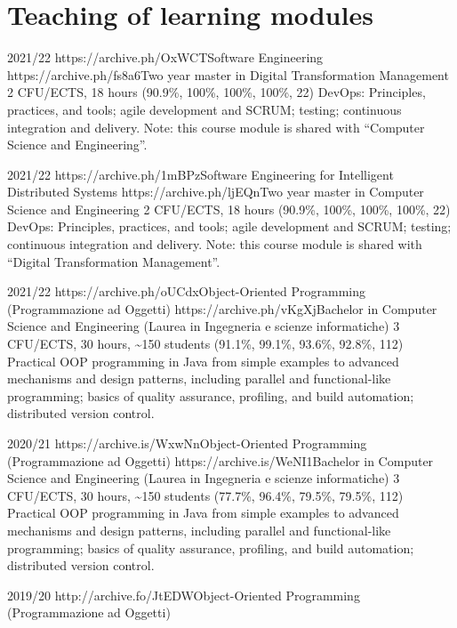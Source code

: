 \section{Teaching of learning modules}
\vspace{-1.9em}
\newcommand{\oopjava}{Practical OOP programming in Java from simple examples to advanced mechanisms and design patterns, including parallel and functional-like programming; basics of quality assurance, profiling, and build automation; distributed version control.}
\newcommand{\sedtmeit}{DevOps: Principles, practices, and tools; agile development and SCRUM; testing; continuous integration and delivery.}
\begin{outerlist}
    \item[2021/22]
        \unibocourse %
        {https://archive.ph/OxWCT}{Software Engineering}
        {https://archive.ph/fs8a6}{Two year master in Digital Transformation Management}
        {2 CFU/ECTS, 18 hours}
        {(90.9\%, 100\%, 100\%, 100\%, 22)}
        {
            \sedtmeit{}
            Note: this course module is shared with ``Computer Science and Engineering''.
        }
    \item[2021/22]
        \unibocourse %
        {https://archive.ph/1mBPz}{Software Engineering for Intelligent Distributed Systems}
        {https://archive.ph/ljEQn}{Two year master in Computer Science and Engineering}
        {2 CFU/ECTS, 18 hours}
        {(90.9\%, 100\%, 100\%, 100\%, 22)}
        {
            \sedtmeit{}
            Note: this course module is shared with ``Digital Transformation Management''.
        }
    \item[2021/22]
        \unibocourse
        {https://archive.ph/oUCdx}{Object-Oriented Programming (Programmazione ad Oggetti)}
        {https://archive.ph/vKgXj}{Bachelor in Computer Science and Engineering (Laurea in Ingegneria e scienze informatiche)}
        {3 CFU/ECTS, 30 hours, \textasciitilde{}150 students}
        {(91.1\%, 99.1\%, 93.6\%, 92.8\%, 112)}
        {\oopjava}
    \item[2020/21]
        \unibocourse
        {https://archive.is/WxwNn}{Object-Oriented Programming (Programmazione ad Oggetti)}
        {https://archive.is/WeNI1}{Bachelor in Computer Science and Engineering (Laurea in Ingegneria e scienze informatiche)}
        {3 CFU/ECTS, 30 hours, \textasciitilde{}150 students}
        {(77.7\%, 96.4\%, 79.5\%, 79.5\%, 112)}
        {\oopjava}
    \item[2019/20]
        \unibocourse
        {http://archive.fo/JtEDW}{Object-Oriented Programming (Programmazione ad Oggetti)}

\end{outerlist}
